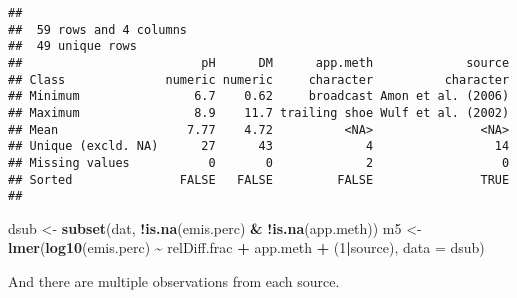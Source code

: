 \documentclass[
]{article}
\newenvironment{Shaded}{\begin{snugshade}}{\end{snugshade}}
\newcommand{\AttributeTok}[1]{\textcolor[rgb]{0.13,0.29,0.53}{#1}}
\newcommand{\DecValTok}[1]{\textcolor[rgb]{0.00,0.00,0.81}{#1}}
\newcommand{\FunctionTok}[1]{\textcolor[rgb]{0.13,0.29,0.53}{\textbf{#1}}}
\newcommand{\NormalTok}[1]{#1}
\newcommand{\OtherTok}[1]{\textcolor[rgb]{0.56,0.35,0.01}{#1}}
\newcommand{\SpecialCharTok}[1]{\textcolor[rgb]{0.81,0.36,0.00}{\textbf{#1}}}
\begin{document}
\begin{verbatim}
## 
##  59 rows and 4 columns
##  49 unique rows
##                         pH      DM      app.meth             source
## Class              numeric numeric     character          character
## Minimum                6.7    0.62     broadcast Amon et al. (2006)
## Maximum                8.9    11.7 trailing shoe Wulf et al. (2002)
## Mean                  7.77    4.72          <NA>               <NA>
## Unique (excld. NA)      27      43             4                 14
## Missing values           0       0             2                  0
## Sorted               FALSE   FALSE         FALSE               TRUE
## 
\end{verbatim}

\begin{Shaded}
\begin{Highlighting}[]
\NormalTok{dsub }\OtherTok{\textless{}{-}} \FunctionTok{subset}\NormalTok{(dat, }\SpecialCharTok{!}\FunctionTok{is.na}\NormalTok{(emis.perc) }\SpecialCharTok{\&} \SpecialCharTok{!}\FunctionTok{is.na}\NormalTok{(app.meth))}
\NormalTok{m5 }\OtherTok{\textless{}{-}} \FunctionTok{lmer}\NormalTok{(}\FunctionTok{log10}\NormalTok{(emis.perc) }\SpecialCharTok{\textasciitilde{}}\NormalTok{  relDiff.frac }\SpecialCharTok{+}\NormalTok{ app.meth }\SpecialCharTok{+}\NormalTok{ (}\DecValTok{1}\SpecialCharTok{|}\NormalTok{source), }\AttributeTok{data =}\NormalTok{ dsub)}
\end{Highlighting}
\end{Shaded}

And there are multiple observations from each source.

\begin{Shaded}
\end{Shaded}
\end{document}
